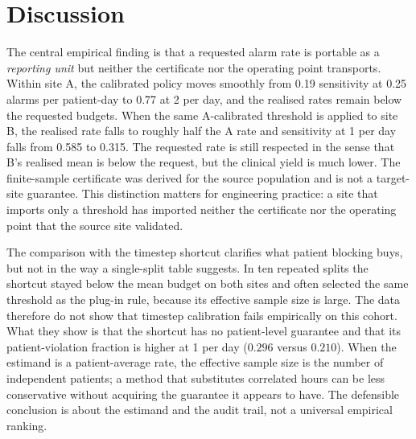 \section{Discussion}
\label{sec:discussion}

The central empirical finding is that a requested alarm rate is portable as a \emph{reporting unit} but neither the certificate nor the operating point transports. Within site A, the calibrated policy moves smoothly from 0.19 sensitivity at 0.25 alarms per patient-day to 0.77 at 2 per day, and the realised rates remain below the requested budgets. When the same A-calibrated threshold is applied to site B, the realised rate falls to roughly half the A rate and sensitivity at 1 per day falls from 0.585 to 0.315. The requested rate is still respected in the sense that B's realised mean is below the request, but the clinical yield is much lower. The finite-sample certificate was derived for the source population and is not a target-site guarantee. This distinction matters for engineering practice: a site that imports only a threshold has imported neither the certificate nor the operating point that the source site validated.

The comparison with the timestep shortcut clarifies what patient blocking buys, but not in the way a single-split table suggests. In ten repeated splits the shortcut stayed below the mean budget on both sites and often selected the same threshold as the plug-in rule, because its effective sample size is large. The data therefore do not show that timestep calibration fails empirically on this cohort. What they show is that the shortcut has no patient-level guarantee and that its patient-violation fraction is higher at 1 per day ($0.296$ versus $0.210$). When the estimand is a patient-average rate, the effective sample size is the number of independent patients; a method that substitutes correlated hours can be less conservative without acquiring the guarantee it appears to have. The defensible conclusion is about the estimand and the audit trail, not a universal empirical ranking.

